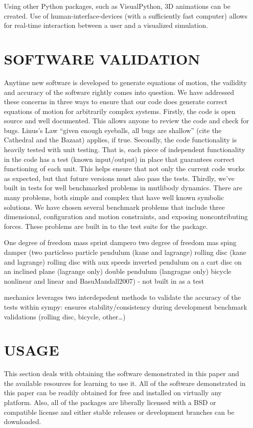 \documentclass[twocolumn,10pt]{asme2e}
\begin{document}
Using other Python packages, such as VisualPython, 3D animations can be
created.
Use of human-interface-devices (with a sufficiently fast computer) allows for
real-time interaction between a user and a visualized simulation.

\section*{SOFTWARE VALIDATION}
Anytime new software is developed to generate equations of motion, the
vailidity and accuracy of the software rightly comes into question. We have
addressed these concerns in three ways to ensure that our code does generate
correct equations of motion for arbitrarily complex systems. Firstly, the code
is open source and well documented. This allows anyone to review the code and
check for bugs. Linus's Law ``given enough eyeballs, all bugs
are shallow'' (cite the Cathedral and the Bazaat) applies, if true.
Secondly, the code functionality is heavily tested with unit testing.  That is,
each piece of independent functionality in the code has a test (known
input/output) in place that guarantees correct functioning of each unit. This
helps ensure that not only the current code works as expected, but that future
versions must also pass the tests. Thirdly, we've built in tests for well
benchmarked problems in mutlibody dynamics. There are many problems, both
simple and complex that have well known symbolic solutions. We have chosen
several benchmark problems that include three dimensional, configuration and
motion constraints, and exposing noncontributing forces. These problems are
built in to the test suite for the package.

One degree of freedom mass sprint dampero
two degree of freedom mas sping damper (two particleso
particle pendulum (kane and lagrange)
rolling disc (kane and lagrange)
rolling disc with aux speeds
inverted pendulum on a cart
disc on an inclined plane (lagrange only)
double pendulum (langragne only)
bicycle nonlinear and linear \cite{Meijaard2007} and BasuMandall2007) - not built in as a test

mechanics leverages two interdepedent methods to validate the accuracy of the
tests within sympy: ensures stability/consistency during development
benchmark validations (rolling disc, bicycle, other\ldots)

\section*{USAGE}
This section deals with obtaining the software demonstrated in this paper and
the available resources for learning to use it. All of the software
demonstrated in this paper can be readily obtained for free and installed on
virtually any platform. Also, all of the packages are liberally licensed with a
BSD or compatible license and either stable releases or development branches
can be downloaded.
\end{document}
